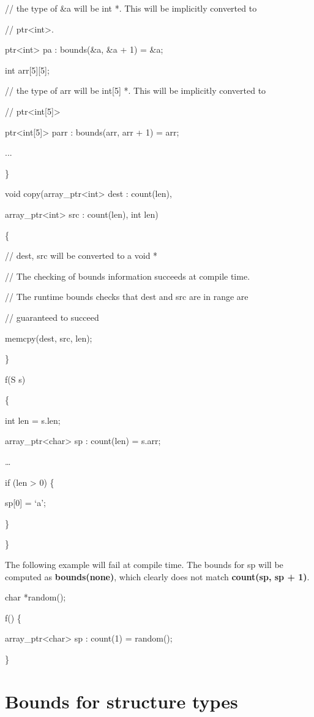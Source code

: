 \documentclass[]{article}
\begin{document}
// the type of \&a will be int *. This will be implicitly converted to

// ptr\textless{}int\textgreater{}.

ptr\textless{}int\textgreater{} pa : bounds(\&a, \&a + 1) = \&a;

int arr{[}5{]}{[}5{]};

// the type of arr will be int{[}5{]} *. This will be implicitly
converted to

// ptr\textless{}int{[}5{]}\textgreater{}

ptr\textless{}int{[}5{]}\textgreater{} parr : bounds(arr, arr + 1) =
arr;

...

\}

void copy(array\_ptr\textless{}int\textgreater{} dest : count(len),

array\_ptr\textless{}int\textgreater{} src : count(len), int len)

\{

// dest, src will be converted to a void *

// The checking of bounds information succeeds at compile time.

// The runtime bounds checks that dest and src are in range are

// guaranteed to succeed

memcpy(dest, src, len);

\}

f(S s)

\{

int len = s.len;

array\_ptr\textless{}char\textgreater{} sp : count(len) = s.arr;

\ldots{}

if (len \textgreater{} 0) \{

sp{[}0{]} = `a';

\}

\}

The following example will fail at compile time. The bounds for sp will
be computed as \textbf{bounds(none)}, which clearly does not match
\textbf{count(sp, sp + 1)}.

char *random();

f() \{

array\_ptr\textless{}char\textgreater{} sp : count(1) = random();

\}

\section{\texorpdfstring{\protect\hypertarget{ux5fRef424291618}{}{\protect\hypertarget{ux5fToc424307702}{}{\protect\hypertarget{ux5fToc426641092}{}{\protect\hypertarget{ux5fToc435434974}{}{\protect\hypertarget{ux5fToc437460805}{}{\protect\hypertarget{ux5fToc440445486}{}{\protect\hypertarget{ux5fToc440449268}{}{\protect\hypertarget{ux5fToc440551918}{}{}}}}}}}}Bounds
for structure
types}{Bounds for structure types}}\label{bounds-for-structure-types}
\end{document}
